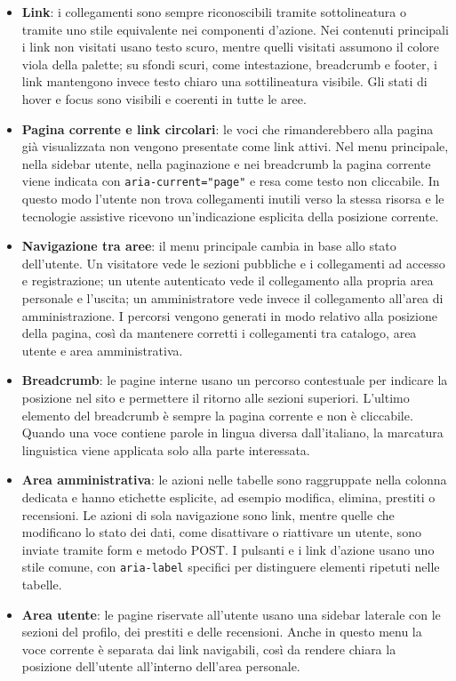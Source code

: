 ﻿\documentclass{article}
\begin{document}
\begin{itemize}
    \item \textbf{Link}: i collegamenti sono sempre riconoscibili tramite sottolineatura o tramite uno stile equivalente nei componenti d'azione. Nei contenuti principali i link non visitati usano testo scuro, mentre quelli visitati assumono il colore viola della palette; su sfondi scuri, come intestazione, breadcrumb e footer, i link mantengono invece testo chiaro una sottilineatura visibile. Gli stati di hover e focus sono visibili e coerenti in tutte le aree.
    \item \textbf{Pagina corrente e link circolari}: le voci che rimanderebbero alla pagina già visualizzata non vengono presentate come link attivi. Nel menu principale, nella sidebar utente, nella paginazione e nei breadcrumb la pagina corrente viene indicata con \texttt{aria-current="page"} e resa come testo non cliccabile. In questo modo l'utente non trova collegamenti inutili verso la stessa risorsa e le tecnologie assistive ricevono un'indicazione esplicita della posizione corrente.
    \item \textbf{Navigazione tra aree}: il menu principale cambia in base allo stato dell'utente. Un visitatore vede le sezioni pubbliche e i collegamenti ad accesso e registrazione; un utente autenticato vede il collegamento alla propria area personale e l'uscita; un amministratore vede invece il collegamento all'area di amministrazione. I percorsi vengono generati in modo relativo alla posizione della pagina, così da mantenere corretti i collegamenti tra catalogo, area utente e area amministrativa.
    \item \textbf{Breadcrumb}: le pagine interne usano un percorso contestuale per indicare la posizione nel sito e permettere il ritorno alle sezioni superiori. L'ultimo elemento del breadcrumb è sempre la pagina corrente e non è cliccabile. Quando una voce contiene parole in lingua diversa dall'italiano, la marcatura linguistica viene applicata solo alla parte interessata.
    \item \textbf{Area amministrativa}: le azioni nelle tabelle sono raggruppate nella colonna dedicata e hanno etichette esplicite, ad esempio modifica, elimina, prestiti o recensioni. Le azioni di sola navigazione sono link, mentre quelle che modificano lo stato dei dati, come disattivare o riattivare un utente, sono inviate tramite form e metodo POST. I pulsanti e i link d'azione usano uno stile comune, con \texttt{aria-label} specifici per distinguere elementi ripetuti nelle tabelle.
    \item \textbf{Area utente}: le pagine riservate all'utente usano una sidebar laterale con le sezioni del profilo, dei prestiti e delle recensioni. Anche in questo menu la voce corrente è separata dai link navigabili, così da rendere chiara la posizione dell'utente all'interno dell'area personale.

\end{itemize}
\end{document}

